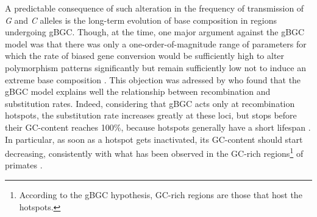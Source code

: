 A predictable consequence of such alteration in the frequency of transmission of \textit{G} and \textit{C} alleles is the long-term evolution of base composition in regions undergoing gBGC\@.
Though, at the time, one major argument against the gBGC model was that there was only a one-order-of-magnitude range of parameters for which the rate of biased gene conversion would be sufficiently high to alter polymorphism patterns significantly but remain sufficiently low not to induce an extreme base composition \citep{eyre-walker1999evidence}.
This objection was adressed by \citet{duret2008impact} who found that the gBGC model explains well the relationship between recombination and substitution rates.
Indeed, considering that gBGC acts only at recombination hotspots, the substitution rate increases greatly at these loci, but stops before their GC-content reaches 100\%, because hotspots generally have a short lifespan \citep{ptak2005finescale,winckler2005comparison}. 
In particular, as soon as a hotspot gets inactivated, its GC-content should start decreasing, consistently with what has been observed in the GC-rich regions\footnote{According to the gBGC hypothesis, GC-rich regions are those that host the hotspots.} of primates \citep{duret2002vanishing,belle2004decline,meunier2004recombination,duret2006gc}.


